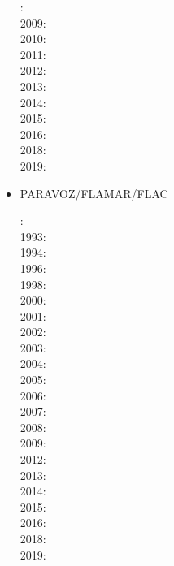 \begin{itemize}
{\small
{}: \cite{daks08}\cite{scdk08}\\
2009: \cite{gogk09}\\
2010: \cite{krda10}\cite{kaus10}\cite{dekc10}\\
2011: \cite{yakm11}\\
2012: \cite{gebk12}\cite{rukb12}\cite{thka12}\\
2013: \cite{scpo13}\\
2014: \cite{jobk14}\\
2015: \cite{lukz15}\cite{gehm15}\cite{thkp15}\cite{musd15}\\
2016: \cite{jads16}\cite{maka16}\cite{cakp16}\\
2018: \cite{dusd18}\cite{jasc18}\cite{jadg18}\cite{comj18}\cite{jens18}\cite{rabw18}\cite{chsm18}\\
2019: \cite{anpa19}\cite{sifg19}\cite{baba19}\cite{sogh19}
}


\item PARAVOZ/FLAMAR/FLAC 

{\small
{}: \cite{cund89}\cite{hoor89}\\
1993: \cite{pocp93}\cite{zhhj93}\\
1994: \cite{wizh94}\\
1996: \cite{hach96}\cite{zhho96}\\
1998: \cite{gepd98}\\
2000: \cite{labp00}\\
2001: \cite{bujl01}\cite{bupo01}\\
2002: \cite{bast02}\cite{clbb02}\\
2003: \cite{hags03}\cite{gehd03}\cite{upke03}\\
2004: \cite{guhl04}\cite{gewi04}\cite{toba04}\cite{tibb04}\cite{clbm04}\cite{tobj04}\\
2005: \cite{bugu05}\\
2006: \cite{buwa06}\cite{lemm06}\\
2007: \cite{yaab07}\cite{buto07}\cite{chem07}\\
2008: \cite{yaba08}\cite{tibb08}\cite{buya08}\\
2009: \cite{gecm09}\cite{yahb09}\cite{bucl09}\cite{tigv09}\cite{yamb09}\\
2012: \cite{anwb12}\cite{gech12}\cite{gubc12}\cite{gerb12}\\
2013: \cite{wabd13}\cite{frbm13}\cite{tibb13}\\
2014: \cite{frba14}\cite{gagb14}\cite{bufa14}\cite{bufy14b}\\
2015: \cite{wulc15}\cite{gebw15}\cite{svlh15}\\
2016: \cite{marl16}\\
2018: \cite{gesr18}\\
2019: \cite{jala19}
}


\end{itemize}
